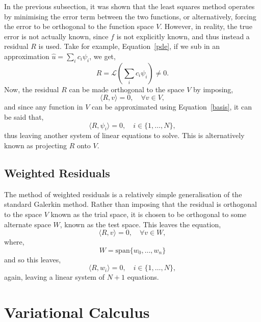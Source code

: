 In the previous subsection, it was shown that the least squares method operates by minimising the error term between the two functions, or alternatively, forcing the error to be orthogonal to the function space $V$. However, in reality, the true error is not actually known, since $f$ is not explicitly known, and thus instead a residual $R$ is used. Take for example, Equation~\eqref{pde}, if we sub in an approximation $\hat{u} = \sum_i c_i \psi_i$, we get,
\begin{equation}
	R = \mathcal{L}\left(\sum_i c_i \psi_i\right) \neq 0.
\end{equation}
Now, the residual $R$ can be made orthogonal to the space $V$ by imposing,
\begin{equation}
	\langle R, v \rangle=0,\quad\forall v \in V,
\end{equation}
and since any function in $V$ can be approximated using Equation~\eqref{basis}, it can be said that,
\begin{equation}
	\langle R, \psi_i \rangle=0,\quad i\in\{1,\dots,N\},
\end{equation}
thus leaving another system of linear equations to solve. This is alternatively known as projecting $R$ onto $V$.
\cite{mardal}

\subsection{Weighted Residuals}\label{residuals}

The method of weighted residuals is a relatively simple generalisation of the standard Galerkin method. Rather than imposing that the residual is orthogonal to the space $V$ known as the trial space, it is chosen to be orthogonal to some alternate space $W$, known as the test space. This leaves the equation,
\begin{equation}
	\langle R, v \rangle=0,\quad \forall v \in W,
\end{equation}
where,
\begin{equation}
	W = \text{span}\{w_0,\dots,w_n\}
\end{equation}
and so this leaves,
\begin{equation}
	\langle R, w_i \rangle=0,\quad i\in\{1,\dots,N\},
\end{equation}
again, leaving a linear system of $N+1$ equations.
\cite{mardal}

\section{Variational Calculus}

